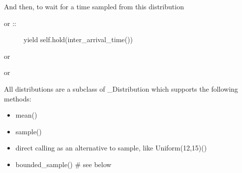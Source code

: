 \documentclass[letterpaper,10pt,english]{sphinxmanual}
\begin{document}
\begin{sphinxVerbatim}[commandchars=\\\{\}]
  
\end{sphinxVerbatim}

And then, to wait for a time sampled from this distribution

\begin{sphinxVerbatim}[commandchars=\\\{\}]
 
\end{sphinxVerbatim}
\begin{description}
\item[{or ::}] \leavevmode
yield self.hold(inter\_arrival\_time())

\end{description}

or

\begin{sphinxVerbatim}[commandchars=\\\{\}]
 
\end{sphinxVerbatim}

or

\begin{sphinxVerbatim}[commandchars=\\\{\}]
 
\end{sphinxVerbatim}

All distributions are a subclass of \_Distribution which supports the following methods:
\begin{itemize}
\item {} 
mean()

\item {} 
sample()

\item {} 
direct calling as an alternative to sample, like Uniform(12,15)()

\item {} 
bounded\_sample()  \# see below

\end{itemize}
\end{document}

